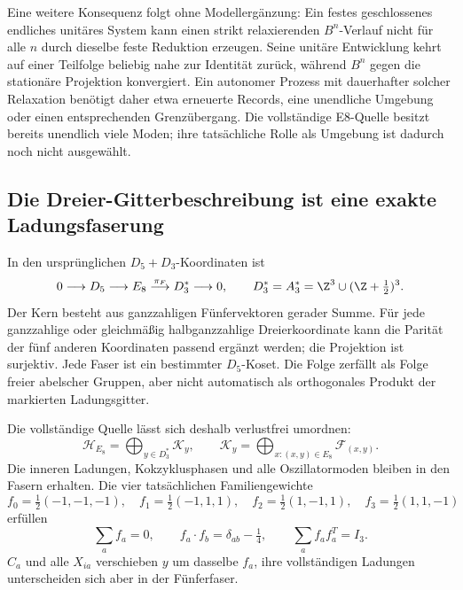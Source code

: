 
Eine weitere Konsequenz folgt ohne Modellergänzung: Ein festes geschlossenes endliches unitäres System kann einen strikt relaxierenden $B^n$-Verlauf nicht für alle $n$ durch dieselbe feste Reduktion erzeugen. Seine unitäre Entwicklung kehrt auf einer Teilfolge beliebig nahe zur Identität zurück, während $B^n$ gegen die stationäre Projektion konvergiert. Ein autonomer Prozess mit dauerhafter solcher Relaxation benötigt daher etwa erneuerte Records, eine unendliche Umgebung oder einen entsprechenden Grenzübergang. Die vollständige E8-Quelle besitzt bereits unendlich viele Moden; ihre tatsächliche Rolle als Umgebung ist dadurch noch nicht ausgewählt.

\subsection{Die Dreier-Gitterbeschreibung ist eine exakte Ladungsfaserung}
In den ursprünglichen $D_5+D_3$-Koordinaten ist
\begin{equation}
0\longrightarrow D_5\longrightarrow E_8
\overset{\pi_F}{\longrightarrow}D_3^*\longrightarrow0,\qquad
D_3^*=A_3^*=\Z^3\cup(\Z+\tfrac12)^3.
\end{equation}
Der Kern besteht aus ganzzahligen Fünfervektoren gerader Summe.
Für jede ganzzahlige oder gleichmäßig halbganzzahlige Dreierkoordinate kann die Parität der fünf anderen Koordinaten passend ergänzt werden; die Projektion ist surjektiv. Jede Faser ist ein bestimmter $D_5$-Koset. Die Folge zerfällt als Folge freier abelscher Gruppen, aber nicht automatisch als orthogonales Produkt der markierten Ladungsgitter.

Die vollständige Quelle lässt sich deshalb verlustfrei umordnen:
\begin{equation}
\mathcal H_{E_8}=\bigoplus_{y\in D_3^*}\mathcal K_y,\qquad
\mathcal K_y=\bigoplus_{x:(x,y)\in E_8}\mathcal F_{(x,y)}.
\end{equation}
Die inneren Ladungen, Kokzyklusphasen und alle Oszillatormoden bleiben in den Fasern erhalten. Die vier tatsächlichen Familiengewichte
\begin{equation}
f_0=\tfrac12(-1,-1,-1),\quad f_1=\tfrac12(-1,1,1),\quad
f_2=\tfrac12(1,-1,1),\quad f_3=\tfrac12(1,1,-1)
\end{equation}
erfüllen
\begin{equation}
\sum_a f_a=0,\qquad f_a\cdot f_b=\delta_{ab}-\tfrac14,
\qquad\sum_a f_af_a^T=I_3.
\end{equation}
$C_a$ und alle $X_{ia}$ verschieben $y$ um dasselbe $f_a$, ihre vollständigen Ladungen unterscheiden sich aber in der Fünferfaser.

